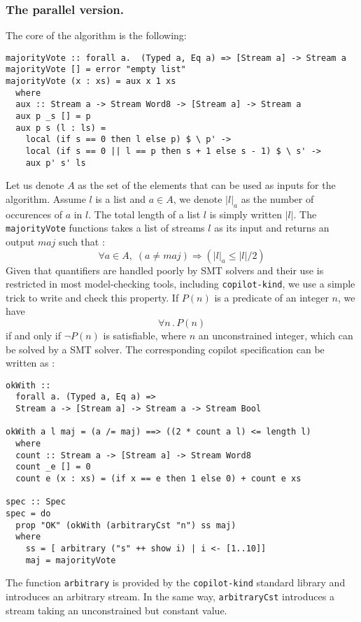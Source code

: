 \subsubsection{The parallel version.} The core of the algorithm is the
following:

\begin{lstlisting}[frame=single]
majorityVote :: forall a.  (Typed a, Eq a) => [Stream a] -> Stream a
majorityVote [] = error "empty list"
majorityVote (x : xs) = aux x 1 xs
  where
  aux :: Stream a -> Stream Word8 -> [Stream a] -> Stream a
  aux p _s [] = p
  aux p s (l : ls) =
    local (if s == 0 then l else p) $ \ p' ->
    local (if s == 0 || l == p then s + 1 else s - 1) $ \ s' ->
    aux p' s' ls
\end{lstlisting} 
Let us denote $A$ as the set of the elements that can be used as
inputs for the algorithm.  Assume $l$ is a list and $a \in A$, we
denote $|l|_a$ as the number of occurences of $a$ in $l$. The total
length of a list $l$ is simply written $|l|$. The
\texttt{majorityVote} functions takes a list of streams $l$ as its
input and returns an output $maj$ such that : \[ \forall a \in A, \;
\left( a \neq maj \right) \Longrightarrow \left(|l|_a \leq |l| /
  {2}\right) \] Given that quantifiers are handled poorly by SMT
solvers and their use is restricted in most model-checking tools,
including \texttt{copilot-kind}, we use a simple trick to write
and check this property.  If $P(n)$ is a predicate of an integer $n$,
we have $$\forall n \, . \, P(n)$$ if and only if $\neg P(n)$ is
satisfiable, where $n$ an unconstrained integer, which can be solved
by a SMT solver. The corresponding copilot specification can be
written as :
\begin{lstlisting}[frame=single]
okWith :: 
  forall a. (Typed a, Eq a) => 
  Stream a -> [Stream a] -> Stream a -> Stream Bool
  
okWith a l maj = (a /= maj) ==> ((2 * count a l) <= length l)
  where
  count :: Stream a -> [Stream a] -> Stream Word8
  count _e [] = 0
  count e (x : xs) = (if x == e then 1 else 0) + count e xs

spec :: Spec
spec = do
  prop "OK" (okWith (arbitraryCst "n") ss maj)
  where
    ss = [ arbitrary ("s" ++ show i) | i <- [1..10]]
    maj = majorityVote
\end{lstlisting}
The function \texttt{arbitrary} is provided by the \texttt{copilot-kind} standard library and introduces an arbitrary stream. In the same way, \texttt{arbitraryCst} introduces a stream taking an unconstrained but constant value.

